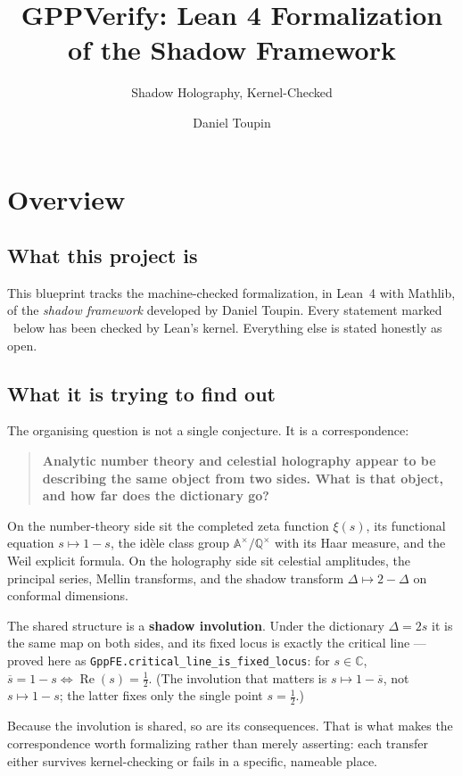 \documentclass{report}
\title{GPPVerify: Lean 4 Formalization of the Shadow Framework}
\subtitle{Shadow Holography, Kernel-Checked}
\author{Daniel Toupin}
\institute{Golden Physics Project}
\theoremstyle{definition}
\begin{document}
\chapter{Overview}

\section{What this project is}

This blueprint tracks the machine-checked formalization, in Lean~4 with Mathlib, of the
\emph{shadow framework} developed by Daniel Toupin. Every statement marked
\leanok\ below has been checked by Lean's kernel. Everything else is stated
honestly as open.

\section{What it is trying to find out}

The organising question is not a single conjecture. It is a correspondence:

\begin{quote}
\textbf{Analytic number theory and celestial holography appear to be describing the same
object from two sides. What is that object, and how far does the dictionary go?}
\end{quote}

On the number-theory side sit the completed zeta function $\xi(s)$, its functional
equation $s \mapsto 1-s$, the id\`ele class group $\mathbb{A}^\times/\mathbb{Q}^\times$
with its Haar measure, and the Weil explicit formula. On the holography side sit
celestial amplitudes, the principal series, Mellin transforms, and the shadow transform
$\Delta \mapsto 2-\Delta$ on conformal dimensions.

The shared structure is a \textbf{shadow involution}. Under the dictionary
$\Delta = 2s$ it is the same map on both sides, and its fixed locus is exactly the
critical line --- proved here as
\texttt{GppFE.critical\_line\_is\_fixed\_locus}: for $s \in \mathbb{C}$,
$\overline{s} = 1-s \iff \operatorname{Re}(s) = \tfrac12$. (The involution that matters
is $s \mapsto 1-\overline{s}$, not $s \mapsto 1-s$; the latter fixes only the single
point $s = \tfrac12$.)

Because the involution is shared, so are its consequences. That is what makes the
correspondence worth formalizing rather than merely asserting: each transfer either
survives kernel-checking or fails in a specific, nameable place.
\end{document}
